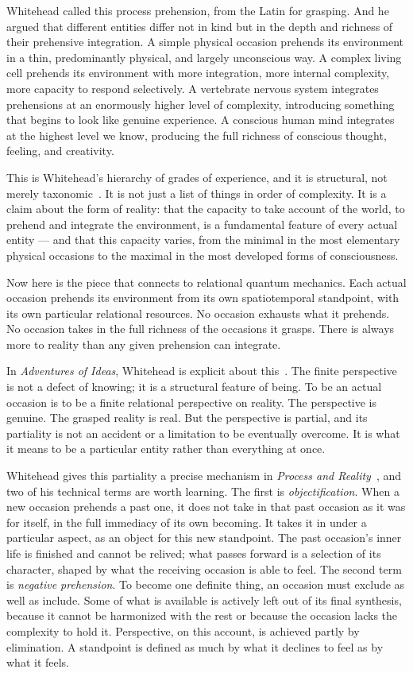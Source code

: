 Whitehead called this process prehension, from the Latin for grasping.
And he argued that different entities differ not in kind but in the depth and richness of their prehensive integration.
A simple physical occasion prehends its environment in a thin, predominantly physical, and largely unconscious way.
A complex living cell prehends its environment with more integration, more internal complexity, more capacity to respond selectively.
A vertebrate nervous system integrates prehensions at an enormously higher level of complexity, introducing something that begins to look like genuine experience.
A conscious human mind integrates at the highest level we know, producing the full richness of conscious thought, feeling, and creativity.

This is Whitehead's hierarchy of grades of experience, and it is structural, not merely taxonomic~\citep{Whitehead1933}.
It is not just a list of things in order of complexity.
It is a claim about the form of reality: that the capacity to take account of the world, to prehend and integrate the environment, is a fundamental feature of every actual entity --- and that this capacity varies, from the minimal in the most elementary physical occasions to the maximal in the most developed forms of consciousness.

Now here is the piece that connects to relational quantum mechanics.
Each actual occasion prehends its environment from its own spatiotemporal standpoint, with its own particular relational resources.
No occasion exhausts what it prehends.
No occasion takes in the full richness of the occasions it grasps.
There is always more to reality than any given prehension can integrate.

In \emph{Adventures of Ideas}, Whitehead is explicit about this~\citep{Whitehead1933}.
The finite perspective is not a defect of knowing; it is a structural feature of being.
To be an actual occasion is to be a finite relational perspective on reality.
The perspective is genuine.
The grasped reality is real.
But the perspective is partial, and its partiality is not an accident or a limitation to be eventually overcome.
It is what it means to be a particular entity rather than everything at once.

Whitehead gives this partiality a precise mechanism in \emph{Process and Reality}~\citep{Whitehead1929}, and two of his technical terms are worth learning.
The first is \emph{objectification}.
When a new occasion prehends a past one, it does not take in that past occasion as it was for itself, in the full immediacy of its own becoming.
It takes it in under a particular aspect, as an object for this new standpoint.
The past occasion's inner life is finished and cannot be relived; what passes forward is a selection of its character, shaped by what the receiving occasion is able to feel.
The second term is \emph{negative prehension}.
To become one definite thing, an occasion must exclude as well as include.
Some of what is available is actively left out of its final synthesis, because it cannot be harmonized with the rest or because the occasion lacks the complexity to hold it.
Perspective, on this account, is achieved partly by elimination.
A standpoint is defined as much by what it declines to feel as by what it feels.

